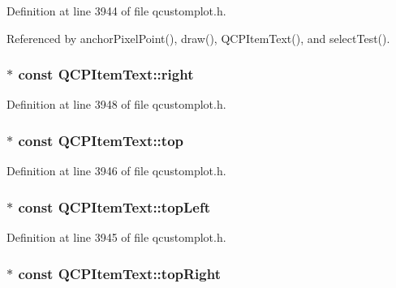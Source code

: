 Definition at line 3944 of file qcustomplot.\+h.



Referenced by anchor\+Pixel\+Point(), draw(), Q\+C\+P\+Item\+Text(), and select\+Test().

\hypertarget{class_q_c_p_item_text_aef159622ce6502412e782a21ba6d84f2}{}
\subsubsection[{right}]{$\ast$ const Q\+C\+P\+Item\+Text\+::right}\label{class_q_c_p_item_text_aef159622ce6502412e782a21ba6d84f2}


Definition at line 3948 of file qcustomplot.\+h.

\hypertarget{class_q_c_p_item_text_a5c87ee162cbbe3d166b97826c8849304}{}
\subsubsection[{top}]{$\ast$ const Q\+C\+P\+Item\+Text\+::top}\label{class_q_c_p_item_text_a5c87ee162cbbe3d166b97826c8849304}


Definition at line 3946 of file qcustomplot.\+h.

\hypertarget{class_q_c_p_item_text_a6354d8762182a3502103fabe5fbb8512}{}
\subsubsection[{top\+Left}]{$\ast$ const Q\+C\+P\+Item\+Text\+::top\+Left}\label{class_q_c_p_item_text_a6354d8762182a3502103fabe5fbb8512}


Definition at line 3945 of file qcustomplot.\+h.

\hypertarget{class_q_c_p_item_text_ad18ac45cb4cc135de1eb78f2e86b6504}{}
\subsubsection[{top\+Right}]{$\ast$ const Q\+C\+P\+Item\+Text\+::top\+Right}\label{class_q_c_p_item_text_ad18ac45cb4cc135de1eb78f2e86b6504}


